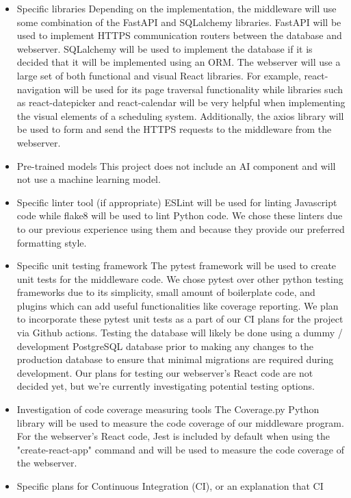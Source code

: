 \documentclass{article}
\begin{document}
\begin{itemize}
\item Specific libraries
\subitem Depending on the implementation, the middleware will use some combination
of the FastAPI and SQLalchemy libraries. FastAPI will be used to implement HTTPS 
communication routers between the database and webserver. SQLalchemy will be used to 
implement the database if it is decided that it will be implemented using an ORM.
\subitem The webserver will use a large set of both functional and visual React
libraries. For example, react-navigation will be used for its page traversal 
functionality while libraries such as react-datepicker and react-calendar will 
be very helpful when implementing the visual elements of a scheduling system. 
Additionally, the axios library will be used to form and send the HTTPS requests 
to the middleware from the webserver.
\item Pre-trained models
\subitem This project does not include an AI component and will not use 
a machine learning model.
\item Specific linter tool (if appropriate)
\subitem ESLint will be used for linting Javascript code while flake8 will be 
used to lint Python code. We chose these linters due to our previous experience 
using them and because they provide our preferred formatting style.
\item Specific unit testing framework
\subitem The pytest framework will be used to create unit tests for the middleware
code. We chose pytest over other python testing frameworks due to its simplicity, 
small amount of boilerplate code, and plugins which can add useful functionalities
like coverage reporting. We plan to incorporate these pytest unit tests as a part
of our CI plans for the project via Github actions.
\subitem Testing the database will likely be done using a dummy / development 
PostgreSQL database prior to making any changes to the production database to 
ensure that minimal migrations are required during development.
\subitem Our plans for testing our webserver's React code are not decided yet, 
but we're currently investigating potential testing options.
\item Investigation of code coverage measuring tools
\subitem The Coverage.py Python library will be used to measure the code coverage
of our middleware program. For the webserver's React code, Jest is included by 
default when using the "create-react-app" command and will be used to measure 
the code coverage of the webserver.
\item Specific plans for Continuous Integration (CI), or an explanation that CI

\end{itemize}
\end{document}
